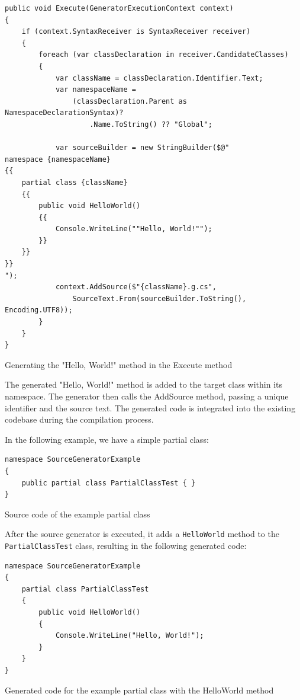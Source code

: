 \begin{listing}[H]
\begin{verbatim}
public void Execute(GeneratorExecutionContext context)
{
    if (context.SyntaxReceiver is SyntaxReceiver receiver)
    {
        foreach (var classDeclaration in receiver.CandidateClasses)
        {
            var className = classDeclaration.Identifier.Text;
            var namespaceName = 
                (classDeclaration.Parent as NamespaceDeclarationSyntax)?
                    .Name.ToString() ?? "Global";
            
            var sourceBuilder = new StringBuilder($@"
namespace {namespaceName}
{{
    partial class {className}
    {{
        public void HelloWorld()
        {{
            Console.WriteLine(""Hello, World!"");
        }}
    }}
}}
");
            context.AddSource($"{className}.g.cs", 
                SourceText.From(sourceBuilder.ToString(), Encoding.UTF8));
        }
    }
}
\end{verbatim}
\caption{Generating the "Hello, World!" method in the Execute method}
\end{listing}

The generated "Hello, World!" method is added to the target class within its namespace. The generator then calls the AddSource method, passing a unique identifier and the source text. The generated code is integrated into the existing codebase during the compilation process.

In the following example, we have a simple partial class:

\begin{listing}[H]
\begin{verbatim}
namespace SourceGeneratorExample
{
    public partial class PartialClassTest { }
}
\end{verbatim}
\caption{Source code of the example partial class}
\end{listing}

After the source generator is executed, it adds a \texttt{HelloWorld} method to the \texttt{PartialClassTest} class, resulting in the following generated code:

\begin{listing}[H]
\begin{verbatim}
namespace SourceGeneratorExample
{
    partial class PartialClassTest
    {
        public void HelloWorld()
        {
            Console.WriteLine("Hello, World!");
        }
    }
}
\end{verbatim}
\caption{Generated code for the example partial class with the HelloWorld method}
\end{listing}

